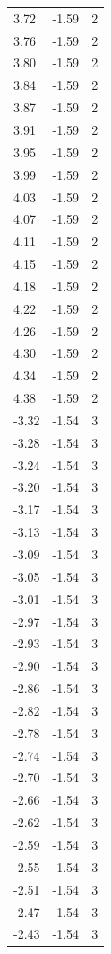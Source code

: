 \begin{longtable}{lrr}
  3.72 & -1.59 & 2 \\
  3.76 & -1.59 & 2 \\
  3.80 & -1.59 & 2 \\
  3.84 & -1.59 & 2 \\
  3.87 & -1.59 & 2 \\
  3.91 & -1.59 & 2 \\
  3.95 & -1.59 & 2 \\
  3.99 & -1.59 & 2 \\
  4.03 & -1.59 & 2 \\
  4.07 & -1.59 & 2 \\
  4.11 & -1.59 & 2 \\
  4.15 & -1.59 & 2 \\
  4.18 & -1.59 & 2 \\
  4.22 & -1.59 & 2 \\
  4.26 & -1.59 & 2 \\
  4.30 & -1.59 & 2 \\
  4.34 & -1.59 & 2 \\
  4.38 & -1.59 & 2 \\
  -3.32 & -1.54 & 3 \\
  -3.28 & -1.54 & 3 \\
  -3.24 & -1.54 & 3 \\
  -3.20 & -1.54 & 3 \\
  -3.17 & -1.54 & 3 \\
  -3.13 & -1.54 & 3 \\
  -3.09 & -1.54 & 3 \\
  -3.05 & -1.54 & 3 \\
  -3.01 & -1.54 & 3 \\
  -2.97 & -1.54 & 3 \\
  -2.93 & -1.54 & 3 \\
  -2.90 & -1.54 & 3 \\
  -2.86 & -1.54 & 3 \\
  -2.82 & -1.54 & 3 \\
  -2.78 & -1.54 & 3 \\
  -2.74 & -1.54 & 3 \\
  -2.70 & -1.54 & 3 \\
  -2.66 & -1.54 & 3 \\
  -2.62 & -1.54 & 3 \\
  -2.59 & -1.54 & 3 \\
  -2.55 & -1.54 & 3 \\
  -2.51 & -1.54 & 3 \\
  -2.47 & -1.54 & 3 \\
  -2.43 & -1.54 & 3 \\

\end{longtable}
